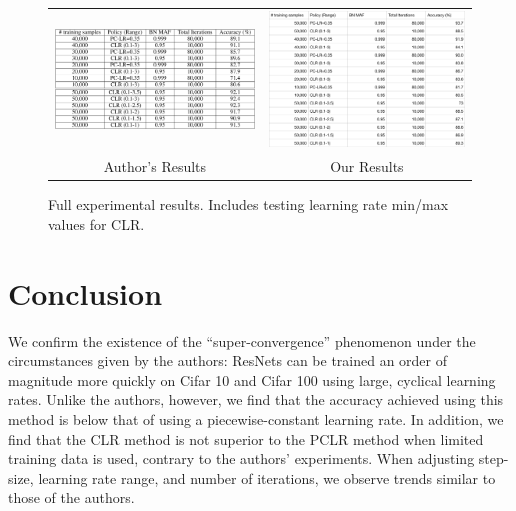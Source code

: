 \documentclass[10pt,twocolumn,letterpaper]{article}
\begin{document}
\begin{figure}[ht!]
    \begin{tabular}{cc}
        \includegraphics[trim=0 0 0 0, clip,
            width=3.25in]{images/their_table.png} &
        \includegraphics[trim=0 0 0 0, clip,
            width=3.25in]{images/our_table.png} \\
        Author's Results & Our Results \\
    \end{tabular}
    \caption{Full experimental results. Includes testing learning rate min/max values for CLR.}
    \label{fig:table}
\end{figure}


\section{Conclusion}
\label{sec:conclusion}
We confirm the existence of the ``super-convergence'' phenomenon under the
circumstances given by the authors: ResNets can be trained an order of
magnitude more quickly on Cifar 10 and Cifar 100 using large, cyclical learning
rates. Unlike the authors, however, we find that the accuracy achieved using
this method is below that of using a piecewise-constant learning rate. In
addition, we find that the CLR method is not superior to the PCLR method when
limited training data is used, contrary to the authors' experiments. When
adjusting step-size, learning rate range, and number of iterations, we observe
trends similar to those of the authors.
\end{document}
